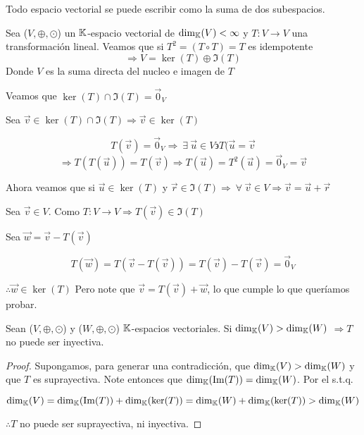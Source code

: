 \begin{corollary}
    Todo espacio vectorial se puede escribir como la suma de dos subespacios. 
\end{corollary}

\begin{eg}
    Sea ($V, \oplus, \odot$) un $\mathbb{K}$-espacio vectorial de $ {\dim}_{\mathbb{K}}(V) < \infty$ y $T : V \to V$ una transformación lineal. Veamos que si $T^2 = (T \circ T) = T$ es idempotente 
    $$\Rightarrow V = \ker(T) \oplus \Im(T)$$
    Donde $V$ es la suma directa del nucleo e imagen de $T$
\end{eg}

\begin{proofexplanation}
    Veamos que $\ker(T) \cap \Im(T) = \vec{0}_V$

    Sea $\vec{v} \in \ker(T) \cap \Im(T) \Rightarrow \vec{v} \in \ker(T) $

    $$T(\vec{v}) = \vec{0}_V \Rightarrow \: \exists \: \vec{u} \in V \backepsilon T(\vec{u} = \vec{v}$$
    $$\Rightarrow T(T(\vec{u})) = T(\vec{v}) \Rightarrow T(\vec{u}) = T^2(\vec{u}) = \vec{0}_V = \vec{v}$$

    Ahora veamos que si $\vec{u} \in \ker(T)$ y $\vec{r} \in \Im(T) \Rightarrow \: \forall \: \vec{v} \in V \Rightarrow \vec{v} = \vec{u}  + \vec{r} $

    Sea $\vec{v} \in V $. Como $T : V \to V \Rightarrow T(\vec{v} ) \in \Im(T)$

    Sea $\vec{w} = \vec{v} - T(\vec{v})$

    $$T(\vec{w}) =  T(\vec{v} - T(\vec{v})) = T(\vec{v}) - T(\vec{v}) = \vec{0}_V$$

    $\therefore \vec{w} \in \ker(T)$ Pero note que $\vec{v} = T(\vec{v}) + \vec{w} $, lo que cumple lo que queríamos probar.
\end{proofexplanation}

\begin{theorem}
    Sean ($V, \oplus, \odot$) y ($W, \oplus, \odot$) $\mathbb{K}$-espacios vectoriales. Si ${\dim}_{\mathbb{K}}(V) > {\dim}_{\mathbb{K}}(W) $ $\Rightarrow T$ no puede ser inyectiva.
\end{theorem}

\begin{proof}
    Supongamos, para generar una contradicción, que ${\dim}_{\mathbb{K}}(V) > {\dim}_{\mathbb{K}}(W)$ y que $T$ es suprayectiva. Note entonces que ${\dim}_{\mathbb{K}}(\Im(T)) = {\dim}_{\mathbb{K}}(W)$. Por el  s.t.q.
    
    $${\dim}_{\mathbb{K}}(V) = {\dim}_{\mathbb{K}}(\Im(T)) + {\dim}_{\mathbb{K}}(\ker(T)) = {\dim}_{\mathbb{K}}(W) + {\dim}_{\mathbb{K}}(\ker(T)) > {\dim}_{\mathbb{K}}(W)$$

    $\therefore T$ no puede ser suprayectiva, ni inyectiva.
\end{proof}

